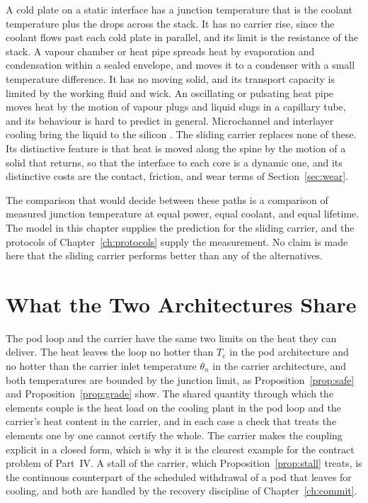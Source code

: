\documentclass[11pt,openany]{book}
\theoremstyle{plain}
\theoremstyle{definition}
\theoremstyle{remark}
\begin{document}
A cold plate on a static interface has a junction temperature that is the coolant temperature plus the drops across the stack. It has no carrier rise, since the coolant flows past each cold plate in parallel, and its limit is the resistance of the stack. A vapour chamber or heat pipe spreads heat by evaporation and condensation within a sealed envelope, and moves it to a condenser with a small temperature difference. It has no moving solid, and its transport capacity is limited by the working fluid and wick. An oscillating or pulsating heat pipe moves heat by the motion of vapour plugs and liquid slugs in a capillary tube, and its behaviour is hard to predict in general. Microchannel and interlayer cooling bring the liquid to the silicon \cite{tuckerman,brunschwiler}. The sliding carrier replaces none of these. Its distinctive feature is that heat is moved along the spine by the motion of a solid that returns, so that the interface to each core is a dynamic one, and its distinctive costs are the contact, friction, and wear terms of Section~\ref{sec:wear}.

The comparison that would decide between these paths is a comparison of measured junction temperature at equal power, equal coolant, and equal lifetime. The model in this chapter supplies the prediction for the sliding carrier, and the protocols of Chapter~\ref{ch:protocols} supply the measurement. No claim is made here that the sliding carrier performs better than any of the alternatives.

\section{What the Two Architectures Share}

The pod loop and the carrier have the same two limits on the heat they can deliver. The heat leaves the loop no hotter than $T_e$ in the pod architecture and no hotter than the carrier inlet temperature $\theta_n$ in the carrier architecture, and both temperatures are bounded by the junction limit, as Proposition~\ref{prop:safe} and Proposition~\ref{prop:grade} show. The shared quantity through which the elements couple is the heat load on the cooling plant in the pod loop and the carrier's heat content in the carrier, and in each case a check that treats the elements one by one cannot certify the whole. The carrier makes the coupling explicit in a closed form, which is why it is the clearest example for the contract problem of Part~IV. A stall of the carrier, which Proposition~\ref{prop:stall} treats, is the continuous counterpart of the scheduled withdrawal of a pod that leaves for cooling, and both are handled by the recovery discipline of Chapter~\ref{ch:commit}.
\end{document}
